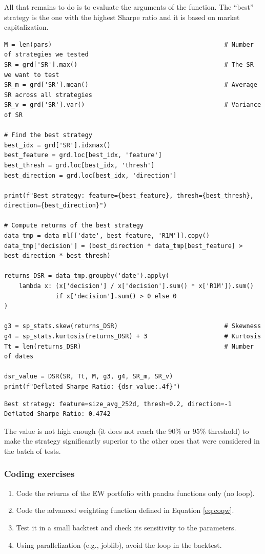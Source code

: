 All that remains to do is to evaluate the arguments of the function. The ``best'' strategy is the one with the highest Sharpe ratio and it is based on market capitalization.

\begin{verbatim}
M = len(pars)                                               # Number of strategies we tested
SR = grd['SR'].max()                                        # The SR we want to test
SR_m = grd['SR'].mean()                                     # Average SR across all strategies
SR_v = grd['SR'].var()                                      # Variance of SR

# Find the best strategy
best_idx = grd['SR'].idxmax()
best_feature = grd.loc[best_idx, 'feature']
best_thresh = grd.loc[best_idx, 'thresh']
best_direction = grd.loc[best_idx, 'direction']

print(f"Best strategy: feature={best_feature}, thresh={best_thresh}, direction={best_direction}")

# Compute returns of the best strategy
data_tmp = data_ml[['date', best_feature, 'R1M']].copy()
data_tmp['decision'] = (best_direction * data_tmp[best_feature] > best_direction * best_thresh)

returns_DSR = data_tmp.groupby('date').apply(
    lambda x: (x['decision'] / x['decision'].sum() * x['R1M']).sum()
              if x['decision'].sum() > 0 else 0
)

g3 = sp_stats.skew(returns_DSR)                             # Skewness
g4 = sp_stats.kurtosis(returns_DSR) + 3                     # Kurtosis
Tt = len(returns_DSR)                                       # Number of dates

dsr_value = DSR(SR, Tt, M, g3, g4, SR_m, SR_v)
print(f"Deflated Sharpe Ratio: {dsr_value:.4f}")
\end{verbatim}

\begin{verbatim}
Best strategy: feature=size_avg_252d, thresh=0.2, direction=-1
Deflated Sharpe Ratio: 0.4742
\end{verbatim}

The value is not high enough (it does not reach the 90\% or 95\% threshold) to make the strategy significantly superior to the other ones that were considered in the batch of tests.

\subsubsection{Coding exercises}

\begin{enumerate}
\item Code the returns of the EW portfolio with pandas functions only (no loop).
\item Code the advanced weighting function defined in Equation \ref{eq:coqw}.
\item Test it in a small backtest and check its sensitivity to the parameters.
\item Using parallelization (e.g., joblib), avoid the loop in the backtest.
\end{enumerate}